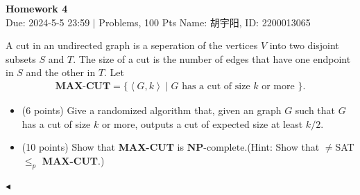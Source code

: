 \documentclass[11pt]{article}
\newcommand{\NPC}{\mathbf{NP}\text{-complete}}
\newenvironment{problem}[2][Problem]{\begin{trivlist}
		\item[\hskip \labelsep {\bfseries #1}\hskip \labelsep {\bfseries #2.}]}{\hfill$\blacktriangleleft$\end{trivlist}}
\begin{document}
	\pagestyle{fancy}
	\chead{}
	\begin{center}
		{\LARGE \bf Homework 4}\\
		{Due: 2024-5-5 23:59 \quad$|$ Problems, 100 Pts}
		{Name: 胡宇阳, ID: 2200013065}
	\end{center}
	\begin{problem}{1.(16 points)}
		A cut in an undirected graph is a seperation of the vertices $V$ into two disjoint subsets $S$ and $T$. The size of a cut is the number of edges that have one endpoint in $S$ and the other in $T$. Let
		\begin{align*}
			\textbf{MAX-CUT} = \{ \left\langle G,k \right\rangle \mid G \text{ has a cut of size $k$ or more }\}.
		\end{align*}
		\begin{itemize}
			\item (6 points) Give a randomized algorithm that, given an graph $G$ such that $G$ has a cut of size $k$ or more, outputs a cut of expected size at least $k/2$. 
			\item (10 points) Show that \textbf{MAX-CUT} is $\NPC$.(Hint: Show that $\neq$SAT $\le_p$ \textbf{MAX-CUT}.) 
		\end{itemize}
	\end{problem}
\end{document}
